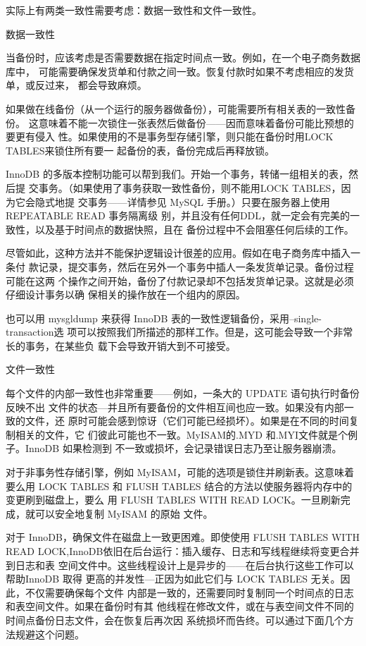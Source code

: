 实际上有两类一致性需要考虑：数据一致性和文件一致性。

数据一致性

当备份时，应该考虑是否需要数据在指定时间点一致。例如，在一个电子商务数据库中，
可能需要确保发货单和付款之间一致。恢复付款时如果不考虑相应的发货单，或反过来，
都会导致麻烦。

如果做在线备份（从一个运行的服务器做备份），可能需要所有相关表的一致性备份。
这意味着不能一次锁住一张表然后做备份——因而意味着备份可能比预想的要更有侵入
性。如果使用的不是事务型存储引擎，则只能在备份时用LOCK TABLES来锁住所有要一
起备份的表，备份完成后再释放锁。

InnoDB 的多版本控制功能可以帮到我们。开始一个事务，转储一组相关的表，然后提
交事务。（如果使用了事务获取一致性备份，则不能用LOCK TABLES，因为它会隐式地提
交事务——详情参见 MySQL 手册。）只要在服务器上使用 REPEATABLE READ 事务隔离级
别，并且没有任何DDL，就一定会有完美的一致性，以及基于时间点的数据快照，且在
备份过程中不会阻塞任何后续的工作。

尽管如此，这种方法并不能保护逻辑设计很差的应用。假如在电子商务库中插入一条付
款记录，提交事务，然后在另外一个事务中插人一条发货单记录。备份过程可能在这两
个操作之间开始，备份了付款记录却不包括发货单记录。这就是必须仔细设计事务以确
保相关的操作放在一个组内的原因。

也可以用 mysgldump 来获得 InnoDB 表的一致性逻辑备份，采用--single-transaction选
项可以按照我们所描述的那样工作。但是，这可能会导致一个非常长的事务，在某些负
载下会导致开销大到不可接受。

文件一致性

每个文件的内部一致性也非常重要——例如，一条大的 UPDATE 语句执行时备份反映不出
文件的状态—并且所有要备份的文件相互间也应一致。如果没有内部一致的文件，还
原时可能会感到惊讶（它们可能已经损坏）。如果是在不同的时间复制相关的文件，它
们彼此可能也不一致。MyISAM的.MYD 和.MYI文件就是个例子。InnoDB 如果检测到
不一致或损坏，会记录错误日志乃至让服务器崩溃。

对于非事务性存储引擎，例如 MyISAM，可能的选项是锁住并刷新表。这意味着要么用
LOCK TABLES 和 FLUSH TABLES 结合的方法以使服务器将内存中的变更刷到磁盘上，要么
用 FLUSH TABLES WITH READ LOCK。一旦刷新完成，就可以安全地复制 MyISAM 的原始
文件。

对于 InnoDB，确保文件在磁盘上一致更困难。即使使用 FLUSH TABLES WITH READ
LOCK,InnoDB依旧在后台运行：插入缓存、日志和写线程继续将变更合并到日志和表
空间文件中。这些线程设计上是异步的——在后台执行这些工作可以帮助InnoDB 取得
更高的并发性—正因为如此它们与 LOCK TABLES 无关。因此，不仅需要确保每个文件
内部是一致的，还需要同时复制同一个时间点的日志和表空间文件。如果在备份时有其
他线程在修改文件，或在与表空间文件不同的时间点备份日志文件，会在恢复后再次因
系统损坏而告终。可以通过下面几个方法规避这个问题。

